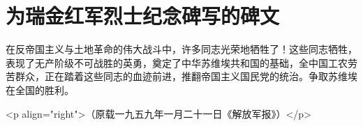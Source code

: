 \section[为瑞金红军烈士纪念碑写的碑文（一九三四年一月十五日）]{为瑞金红军烈士纪念碑写的碑文}


在反帝国主义与土地革命的伟大战斗中，许多同志光荣地牺牲了！这些同志牺牲，表现了无产阶级不可战胜的英勇，奠定了中华苏维埃共和国的基础，全中国工农劳苦群众，正在踏着这些同志的血迹前进，推翻帝国主义国民党的统治。争取苏维埃在全国的胜利。

<p align="right">（原载一九五九年一月二十一日《解放军报》）</p>

